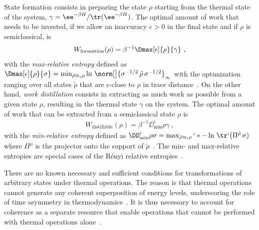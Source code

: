 \documentclass[prl,reprint,longbibliography,superscriptaddress]{revtex4-1}
\renewcommand{\Dminz}[1][]{\DD_{\mathrm{min}}^{#1}}
\begin{document}
State formation consists in preparing the state $\rho$ starting from the thermal
state of the system, $\gamma=\ee^{-\beta H}/\tr(\ee^{-\beta H})$.  The optimal
amount of work that needs to be invested, if we allow an inaccuracy $\epsilon>0$
in the final state and if $\rho$ is semiclassical,
is~\cite{Aberg2013_worklike,Horodecki2013_ThermoMaj}
\begin{align}
  W_{\mathrm{formation}}(\rho) = \beta^{-1}\Dmax[\epsilon]{\rho}{\gamma}\ ,
  \label{eq:Wformation-Dmax}
\end{align}
with the \emph{max-relative entropy} defined as
$\Dmax[\epsilon]{\rho}{\sigma}
= \min_{\tilde\rho\approx_\epsilon\rho}
\ln\, \norm[\big]{ \sigma^{-1/2}\,\tilde\rho\,\sigma^{-1/2} }_{\infty}$
with the optimization ranging over all states $\tilde\rho$ that are
$\epsilon$-close to $\rho$ in trace distance~\cite{Datta2009IEEE_minmax}.  
On the other hand, \emph{work distillation} consists in extracting as much work
as possible from a given state $\rho$, resulting in the thermal state $\gamma$
on the system.  The optimal amount of work that can be extracted from a
semiclassical state $\rho$ is~\cite{Aberg2013_worklike,Horodecki2013_ThermoMaj}
\begin{align}
  W_{\mathrm{distillable}}(\rho) =
  \beta^{-1}\Dminz[\epsilon]{\rho}{\gamma}\ ,
\end{align}
with the \emph{min-relative entropy} defined as
$\Dminz[\epsilon]{\rho}{\sigma}
= \max_{\tilde\rho\approx_\epsilon\rho} `*{
  -\ln\, \tr`\big(\Pi^{\tilde\rho}\,\sigma)
}$
where $\Pi^{\tilde\rho}$ is the projector onto the support of
$\tilde\rho$~\cite{Datta2009IEEE_minmax}.
%
The min- and max-relative entropies are special cases of the R\'enyi relative
entropies~\cite{Renyi1960_MeasOfEntrAndInf,%
  PhDTomamichel2012,BookTomamichel2016_Finite}.

There are no known necessary and sufficient conditions for transformations of
arbitrary states under thermal operations.  The reason is that thermal
operations 
cannot generate any coherent superposition of energy levels, underscoring the
role of time asymmetry in thermodynamics~\cite{%
  Aberg2014PRL_catalytic,%
  Marvian2014PRA_modes,%
  Marvian2014NC_extending,%
  Lostaglio2015NC_beyond,%
  Korzekwa2016NJP_extraction,%
  Gour2017arXiv_entropic,%
  Marvian2018arXiv_distillation,%
  Lostaglio2018arXiv_broadcast}.  It is thus necessary to account for coherence
as a separate resource that enable operations that cannot be performed with
thermal operations alone~\cite{Baumgratz2014PRL_coherence,%
  Winter2016PRL_coherence,%
  Dana2017PRA_beyond,%
  Diaz2018Qu_reusing,%
  Popescu2018arXiv_applications}.
\end{document}
